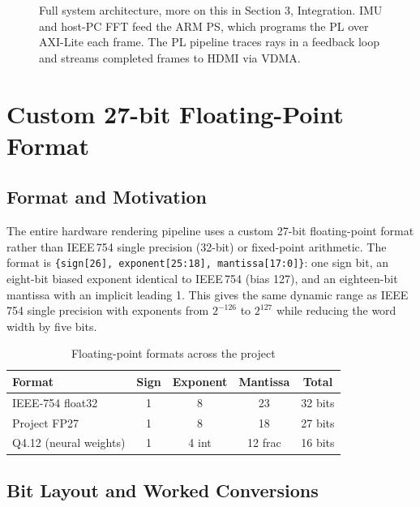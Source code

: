 \begin{figure}[htbp]
\begin{tikzpicture}
\end{tikzpicture}
\caption{Full system architecture, more on this in Section 3, Integration. IMU and host-PC FFT
feed the ARM PS, which programs the PL over AXI-Lite each frame. The PL pipeline traces rays in a
feedback loop and streams completed frames to HDMI via VDMA.}
\label{fig:system_arch}
\end{figure}

\FloatBarrier


\section{Custom 27-bit Floating-Point Format}
\label{sec:fp}

\subsection{Format and Motivation}

The entire hardware rendering pipeline uses a custom 27-bit floating-point
format rather than IEEE\,754 single precision (32-bit) or fixed-point arithmetic.
The format is \texttt{\{sign[26], exponent[25:18], mantissa[17:0]\}}: one sign
bit, an eight-bit biased exponent identical to IEEE\,754 (bias 127), and an
eighteen-bit mantissa with an implicit leading 1. This gives the same dynamic
range as IEEE\,754 single precision with exponents from $2^{-126}$ to $2^{127}$ 
while reducing the word width by five bits.

\begin{table}[htbp]
\centering
\small
\caption{Floating-point formats across the project}
\label{tab:fp_formats}
{\renewcommand{\arraystretch}{1.4}
\begin{tabular}{lcccc}
\toprule
\textbf{Format} & \textbf{Sign} & \textbf{Exponent} & \textbf{Mantissa} & \textbf{Total} \\
\midrule
IEEE-754 float32       & 1 & 8     & 23      & 32 bits \\
Project FP27           & 1 & 8     & 18      & 27 bits \\
Q4.12 (neural weights) & 1 & 4 int & 12 frac & 16 bits \\
\bottomrule
\end{tabular}}
\end{table}

\FloatBarrier

\subsection{Bit Layout and Worked Conversions}

